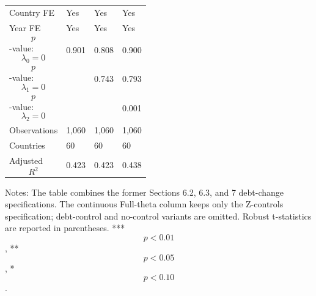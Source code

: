 \begin{table}[H]
\begin{threeparttable}
\begin{tabularx}{\textwidth}{lYYY}
Country FE & Yes & Yes & Yes \\
Year FE & Yes & Yes & Yes \\
$$p$$-value: $$\lambda_0=0$$ & 0.901 & 0.808 & 0.900 \\
$$p$$-value: $$\lambda_1=0$$ &  & 0.743 & 0.793 \\
$$p$$-value: $$\lambda_2=0$$ &  &  & 0.001 \\
Observations & 1,060 & 1,060 & 1,060 \\
Countries & 60 & 60 & 60 \\
Adjusted $$R^2$$ & 0.423 & 0.423 & 0.438 \\
\bottomrule
\end{tabularx}
\begin{tablenotes}[flushleft]\footnotesize
\item Notes: The table combines the former Sections 6.2, 6.3, and 7 debt-change specifications. The continuous Full-theta column keeps only the Z-controls specification; debt-control and no-control variants are omitted. Robust t-statistics are reported in parentheses. *** $$p<0.01$$, ** $$p<0.05$$, * $$p<0.10$$.
\end{tablenotes}
\end{threeparttable}
\end{table}
